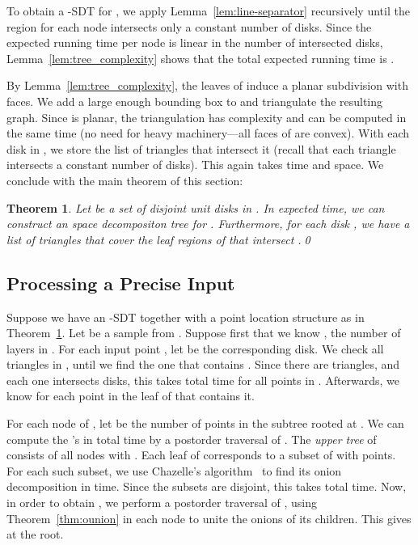 \documentclass{paper}
\newtheorem{theorem}{Theorem}[section]
\begin{document}
To obtain a -SDT  for ,  we apply
Lemma~\ref{lem:line-separator} recursively until the region for
each node intersects only a constant number of disks.
Since the expected running time per node is linear
in the number of intersected disks, 
Lemma~\ref{lem:tree_complexity} shows that the total expected running time
is .

By Lemma~\ref{lem:tree_complexity}, the leaves of  induce a planar
subdivision  with  faces. We add a large enough
bounding box to  and triangulate the resulting graph.
Since  is planar, the triangulation has complexity
 and can be computed in the same time (no need for heavy
machinery---all faces of  are convex). With each disk
in , we store the list of triangles that intersect it
(recall that each triangle intersects a constant number of  disks). 
This again takes  time and space.
We conclude with the main theorem of this section:

\begin{theorem}\label{thm:sdt1}
  Let  be a set of  disjoint unit disks in .
  In  expected time, we can construct
  an  space decompositon tree  for . 
  Furthermore, for each disk , we have
  a list of triangles  that cover the leaf
  regions of  that intersect .\qed
\end{theorem}


\subsection{Processing a Precise Input}

Suppose we have an -SDT together with a point location
structure as in Theorem~\ref{thm:sdt1}.
Let  be a sample
from . Suppose first that we know , the number of 
layers in .
For each input point , let  be the corresponding disk. 
We check all triangles in ,
until we find the one that contains .
Since there are  triangles, and each one intersects 
disks, this takes  total time
for all points in .
Afterwards, we know for each point in  the leaf of  that contains it.

For each node  of , let  be the number of points in the subtree
rooted at . We can compute the 's in total time  by a postorder
traversal of .
The \emph{upper tree}  of  consists of all nodes  with
.
Each leaf of  corresponds to a subset of  with
 points. For each such subset, we use Chazelle's 
algorithm~\cite{c-clps-85}
to find its onion decomposition in  time. 
Since the subsets are disjoint, this takes  total time.
Now, in order to obtain , we perform a postorder traversal of 
, using Theorem~\ref{thm:ounion} in each node to unite the onions of 
its children. This gives  at the root.
\end{document}
